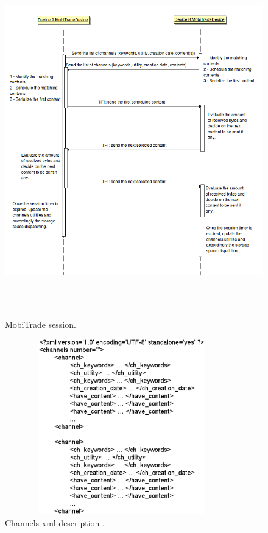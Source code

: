 \begin{figure}[!h]
\begin{center}
\includegraphics[width=5in,height=6in]{Chapitre6/MobiTradeSession.png}
\end{center}
\caption{MobiTrade session.}
\label{mobitradesession}
\end{figure}

\begin{figure}[!h]
\begin{center}
\includegraphics[width=4in,height=3in]{Chapitre6/channelsxml.eps}
\end{center}
\caption{Channels xml description .}
\label{channelsxml}
\end{figure}

